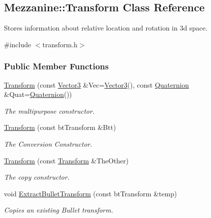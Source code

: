 \hypertarget{classMezzanine_1_1Transform}{
\subsection{Mezzanine::Transform Class Reference}
\label{classMezzanine_1_1Transform}
}


Stores information about relative location and rotation in 3d space.  




{\ttfamily \#include $<$transform.h$>$}

\subsubsection*{Public Member Functions}
\begin{DoxyCompactItemize}
\item 
\hyperlink{classMezzanine_1_1Transform_a0949c0923e41e00af6c9537d5f9094b7}{Transform} (const \hyperlink{classMezzanine_1_1Vector3}{Vector3} \&Vec=\hyperlink{classMezzanine_1_1Vector3}{Vector3}(), const \hyperlink{classMezzanine_1_1Quaternion}{Quaternion} \&Quat=\hyperlink{classMezzanine_1_1Quaternion}{Quaternion}())
\begin{DoxyCompactList}\small\item\em The multipurpose constructor. \item\end{DoxyCompactList}\item 
\hyperlink{classMezzanine_1_1Transform_ad4974a80bdb1625119e98b059e4e91e0}{Transform} (const btTransform \&Btt)
\begin{DoxyCompactList}\small\item\em The Conversion Constructor. \item\end{DoxyCompactList}\item 
\hyperlink{classMezzanine_1_1Transform_ad719d3280b8b94f27b5ba1ce3e8a9a59}{Transform} (const \hyperlink{classMezzanine_1_1Transform}{Transform} \&TheOther)
\begin{DoxyCompactList}\small\item\em The copy constructor. \item\end{DoxyCompactList}\item 
void \hyperlink{classMezzanine_1_1Transform_ade790a95db2817427aea8b7a90f95925}{ExtractBulletTransform} (const btTransform \&temp)
\begin{DoxyCompactList}\small\item\em Copies an existing Bullet transform. \item\end{DoxyCompactList}\item 

\end{DoxyCompactItemize}
